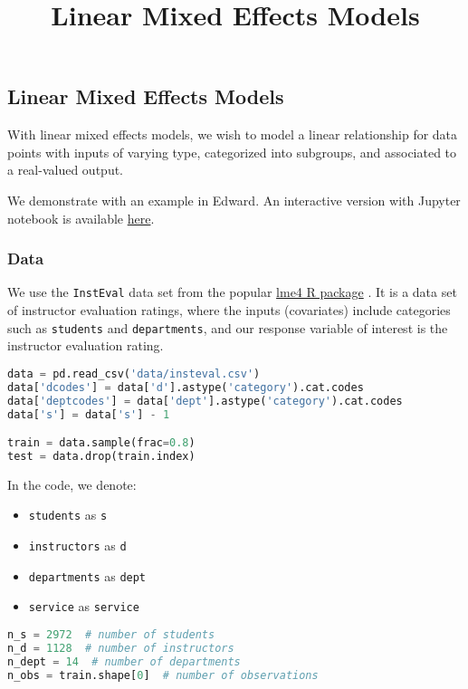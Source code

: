 \title{Linear Mixed Effects Models}

\subsection{Linear Mixed Effects Models}

With linear mixed effects models, we wish to model a linear
relationship for data points with inputs of varying type, categorized
into subgroups, and associated to a real-valued output.

We demonstrate with an example in Edward.
An interactive version with Jupyter notebook is available
\href{http://nbviewer.jupyter.org/github/blei-lab/edward/blob/master/notebooks/linear_mixed_effects_models.ipynb}{here}.

\subsubsection{Data}

We use the \texttt{InstEval} data set from the popular
\href{http://lme4.r-forge.r-project.org}{lme4 R package}
\citep{bates2015fitting}.
It is a data set of instructor evaluation ratings, where the inputs
(covariates) include categories such as \texttt{students} and
\texttt{departments}, and our response variable of interest is the
instructor evaluation rating.

\begin{lstlisting}[language=Python]
data = pd.read_csv('data/insteval.csv')
data['dcodes'] = data['d'].astype('category').cat.codes
data['deptcodes'] = data['dept'].astype('category').cat.codes
data['s'] = data['s'] - 1

train = data.sample(frac=0.8)
test = data.drop(train.index)
\end{lstlisting}

In the code, we denote:
\begin{itemize}
\item \texttt{students} as \texttt{s}
\item \texttt{instructors} as \texttt{d}
\item \texttt{departments} as \texttt{dept}
\item \texttt{service} as \texttt{service}
\end{itemize}

\begin{lstlisting}[language=Python]
n_s = 2972  # number of students
n_d = 1128  # number of instructors
n_dept = 14  # number of departments
n_obs = train.shape[0]  # number of observations
\end{lstlisting}

